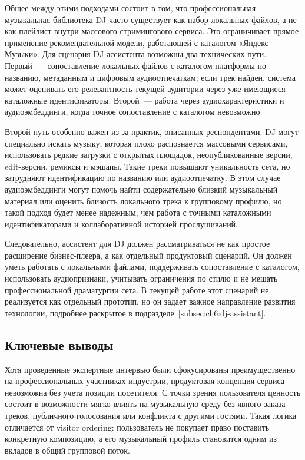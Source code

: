 Общее между этими подходами состоит в том, что профессиональная музыкальная библиотека DJ часто существует как набор локальных файлов, а не как плейлист внутри массового стримингового сервиса. Это ограничивает прямое применение рекомендательной модели, работающей с каталогом «Яндекс Музыки». Для сценария DJ-ассистента возможны два технических пути. Первый~--- сопоставление локальных файлов с каталогом платформы по названию, метаданным и цифровым аудиоотпечаткам; если трек найден, система может оценивать его релевантность текущей аудитории через уже имеющиеся каталожные идентификаторы. Второй~--- работа через аудиохарактеристики и аудиоэмбеддинги, когда точное сопоставление с каталогом невозможно.

Второй путь особенно важен из-за практик, описанных респондентами. DJ могут специально искать музыку, которая плохо распознается массовыми сервисами, использовать редкие загрузки с открытых площадок, неопубликованные версии, edit-версии, ремиксы и мэшапы. Такие треки повышают уникальность сета, но затрудняют идентификацию по названию или аудиоотпечатку. В этом случае аудиоэмбеддинги могут помочь найти содержательно близкий музыкальный материал или оценить близость локального трека к групповому профилю, но такой подход будет менее надежным, чем работа с точными каталожными идентификаторами и коллаборативной историей прослушиваний.

Следовательно, ассистент для DJ должен рассматриваться не как простое расширение бизнес-плеера, а как отдельный продуктовый сценарий. Он должен уметь работать с локальными файлами, поддерживать сопоставление с каталогом, использовать аудиопризнаки, учитывать ограничения по стилю и не мешать профессиональной драматургии сета. В текущей работе этот сценарий не реализуется как отдельный прототип, но он задает важное направление развития технологии, подробнее раскрытое в подразделе~\ref{subsec:ch6:dj-assistant}.

\subsection{Ключевые выводы}
\label{subsec:market:needs-users}
\label{subsec:market:needs-insights}

Хотя проведенные экспертные интервью были сфокусированы преимущественно на профессиональных участниках индустрии, продуктовая концепция сервиса невозможна без учета позиции посетителя. С точки зрения пользователя ценность состоит в возможности мягко влиять на музыкальную среду без явного заказа треков, публичного голосования или конфликта с другими гостями. Такая логика отличается от visitor ordering: пользователь не покупает право поставить конкретную композицию, а его музыкальный профиль становится одним из вкладов в общий групповой поток.

